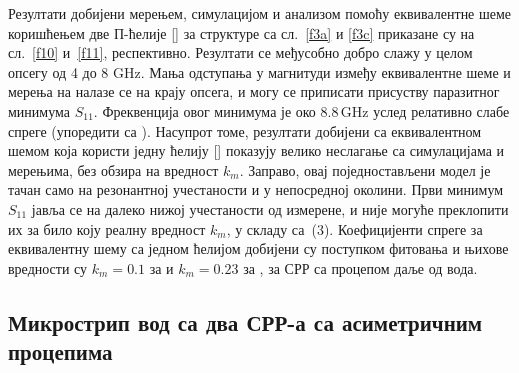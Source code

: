 Резултати добијени мерењем, симулацијом и анализом помоћу еквивалентне шеме коришћењем две П-ћелије [] за структуре са сл.~\ref{f3a} и \ref{f3c} приказане су на сл.~\ref{f10} и~\ref{f11}, респективно. Резултати се међусобно добро слажу у целом опсегу од 4 до 8 GHz. Мања одступања у магнитуди између еквивалентне шеме и мерења на  налазе се на крају опсега, и могу се приписати присуству паразитног минимума $S_{11}$. Фреквенција овог минимума је око $8.8\,$GHz услед релативно слабе спреге (упоредити са ). Насупрот томе, резултати добијени са еквивалентном шемом која користи једну ћелију [] показују велико неслагање са симулацијама и мерењима, без обзира на вредност $k_m$. Заправо, овај поједностављени модел је тачан само на резонантној учестаности и у непосредној околини. Први минимум $S_{11}$ јавља се на далеко нижој учестаности од измерене, и није могуће преклопити их за било коју реалну вредност $k_m$, у складу са~(3). Коефицијенти спреге за еквивалентну шему са једном ћелијом добијени су поступком фитовања и њихове вредности су $k_m=0.1$ за  и $k_m=0.23$ за , за СРР са процепом даље од вода.


\subsection{Микрострип вод са два СРР-а са асиметричним процепима}

